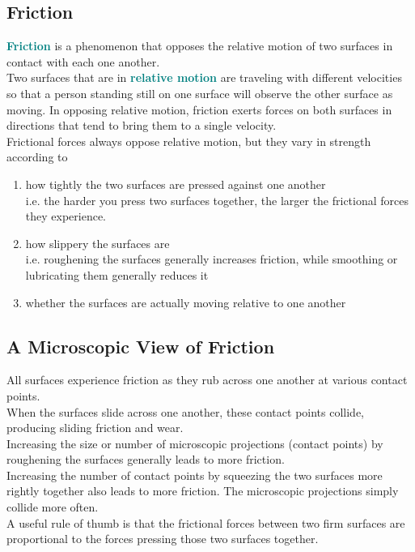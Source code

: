 \documentclass[12pt]{article}
\theoremstyle{definition}
\newcommand{\defnterm}[1]{\textbf{\textcolor{teal}{#1}}\index{#1}}
\begin{document}
\subsection{Friction}
\defnterm{Friction} is a phenomenon that opposes the relative motion of two surfaces in contact with each one another. \\
Two surfaces that are in \defnterm{relative motion} are traveling with different velocities so that a person standing still on one surface will observe the other surface as moving.
In opposing relative motion, friction exerts forces on both surfaces in directions that tend to bring them to a single velocity. \\

Frictional forces always oppose relative motion, but they vary in strength according to
\begin{enumerate}
  \item how tightly the two surfaces are pressed against one another \\
  i.e. the harder you press two surfaces together, the larger the frictional forces they experience.
  \item how slippery the surfaces are \\
  i.e. roughening the surfaces generally increases friction, while smoothing or lubricating them generally reduces it
  \item whether the surfaces are actually moving relative to one another
\end{enumerate}

\subsection{A Microscopic View of Friction}
All surfaces experience friction as they rub across one another at various contact points. \\
When the surfaces slide across one another, these contact points collide, producing sliding friction and wear. \\

Increasing the size or number of microscopic projections (contact points) by roughening the surfaces generally leads to more friction. \\
Increasing the number of contact points by squeezing the two surfaces more rightly together also leads to more friction.
The microscopic projections simply collide more often. \\

A useful rule of thumb is that the frictional forces between two firm surfaces are proportional to the forces pressing those two surfaces together. \\
\end{document}
